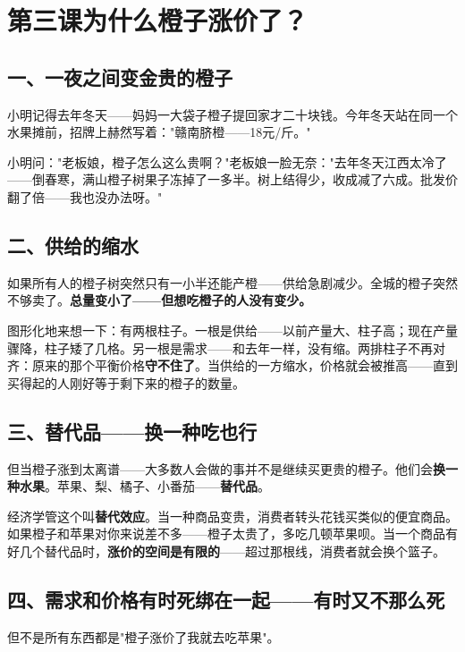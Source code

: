 \documentclass[a4paper,12pt]{ctexart}
\begin{document}
\newpage
\section{\textcolor{orange!80!black}{第三课\quad 为什么橙子涨价了？}}

\subsection*{一、一夜之间变金贵的橙子}

小明记得去年冬天——妈妈一大袋子橙子提回家才二十块钱。今年冬天站在同一个水果摊前，招牌上赫然写着："赣南脐橙——18元/斤。"

小明问："老板娘，橙子怎么这么贵啊？"老板娘一脸无奈："去年冬天江西太冷了——倒春寒，满山橙子树果子冻掉了一多半。树上结得少，收成减了六成。批发价翻了倍——我也没办法呀。"

\subsection*{二、供给的缩水}

如果所有人的橙子树突然只有一小半还能产橙——供给急剧减少。全城的橙子突然不够卖了。\textbf{总量变小了——但想吃橙子的人没有变少。}

图形化地来想一下：有两根柱子。一根是供给——以前产量大、柱子高；现在产量骤降，柱子矮了几格。另一根是需求——和去年一样，没有缩。两排柱子不再对齐：原来的那个平衡价格\textbf{守不住了}。当供给的一方缩水，价格就会被推高——直到买得起的人刚好等于剩下来的橙子的数量。

\subsection*{三、替代品——换一种吃也行}

但当橙子涨到太离谱——大多数人会做的事并不是继续买更贵的橙子。他们会\textbf{换一种水果}。苹果、梨、橘子、小番茄——\textbf{替代品}。

经济学管这个叫\textbf{替代效应}。当一种商品变贵，消费者转头花钱买类似的便宜商品。如果橙子和苹果对你来说差不多——橙子太贵了，多吃几顿苹果呗。当一个商品有好几个替代品时，\textbf{涨价的空间是有限的}——超过那根线，消费者就会换个篮子。

\subsection*{四、需求和价格有时死绑在一起——有时又不那么死}

但不是所有东西都是"橙子涨价了我就去吃苹果"。
\end{document}
